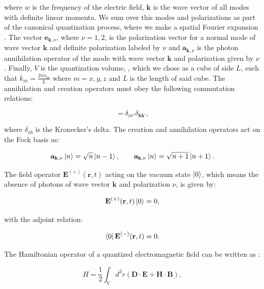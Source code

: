 \documentclass[12pt]{book}
\begin{document}
where $w$ is the frequency of the electric field, $\mathbf{k}$ is the wave vector of all modes with definite linear momenta. We sum over this modes and polarizations as part of the canonical quantization process, where we make a spatial Fourier expansion \cite{grynberg}. The vector $\mathbf{e}_{\textbf{k},\nu}$, where $\nu=1,2$, is the polarization vector for a normal mode of wave vector $\mathbf{k}$ and definite polarization labeled by $\nu$ and $\mathbf{a}_{\textbf{k},\nu}$ is the photon annihilation operator of the mode with wave vector $\mathbf{k}$ and polarization given by $\nu$. Finally, $V$ is the quantization volume, , which we chose as a cube of side $L$, such that $k_{m}=\frac{2 \pi n_{m}}{L}$ where $m=x,y,z$ and $L$ is the length of said cube. The annihilation and creation operators must obey the following commutation relations:

\begin{equation}
[\mathbf{a}_{\textbf{k},\nu},\mathbf{a^{\dagger}}_{\textbf{k},\nu}]=\delta_{\nu \nu'}\delta_{\textbf{k}\textbf{k'}},
\end{equation}

where $\delta_{ab}$ is the Kronecker's delta. The creation and annihilation operators act on the Fock basis as:

\begin{equation}
    \mathbf{a}_{\textbf{k},\nu}\ket{n}=\sqrt{n}\ket{n-1},\qquad
    \mathbf{a}_{\textbf{k},\nu}\ket{n}=\sqrt{n+1}\ket{n+1}.\label{Fock}
\end{equation}

The field operator $\textbf{E}^{(+)} (\textbf{r},t)$ acting on the vacuum state $\ket{0}$, which means the absence of photons of wave vector $\mathbf{k}$ and polarization $\nu$, is given by:

\begin{equation}
\textbf{E}^{(+)} (\textbf{r},t)\ket{0}=0,
\end{equation}

 with the adjoint relation:

\begin{equation}
\bra{0}\textbf{E}^{(-)} (\textbf{r},t)=0.
\end{equation}

The Hamiltonian operator of a quantized electromagnetic field can be written as \cite{jackson}:

\begin{equation}
H=\frac{1}{2}\int_{V} d^{3}r (\mathbf{D \cdot E}+\mathbf{H \cdot B}),
\end{equation}
\end{document}
